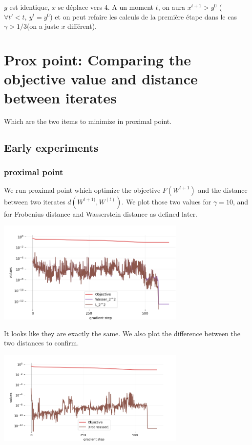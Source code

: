 $y$ est identique, $x$ se déplace vers 4. A un moment $t$, on aura $x^{t+1} > y^{0}$ ($\forall t' < t, \ y^t = y^0$) et on peut refaire les calculs de la première étape dans le cas $\gamma > 1/3$(on a juste $x$ différent).

\section{Prox point: Comparing the objective value and distance between iterates}
Which are the two items to minimize in proximal point.
\subsection{Early experiments}
\subsubsection{proximal point}


We run proximal point which optimize the objective $F(W^{t+1})$ and the distance between two iterates $d(W^{t+1)}, W^{(t)})$. We plot those two values for $\gamma=10$, and for Frobenius distance and Wasserstein distance as defined later.

\includegraphics[width=0.7\textwidth]{imgs/tau10_graph_full.png}


It looks like they are exactly the same. We also plot the difference between the two distances to confirm.

\includegraphics[width=0.7\textwidth]{imgs/tau10_graph.png}


